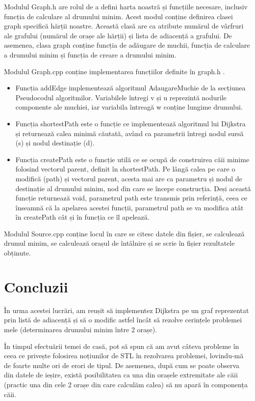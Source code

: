 \documentclass[a4paper]{article}
\begin{document}
Modulul Graph.h are rolul de a defini harta noastră și funcțiile necesare, inclusiv funcția de calculare al drumului minim. 
Acest modul conține definirea clasei graph specifică hărții noastre. Această clasă are ca atribute numărul de vârfruri ale grafului (numărul de orașe ale hărții) și lista de adiacență a grafului. 
De asemenea, clasa graph conține funcția de adăugare de muchii, funcția de calculare a drumului minim și funcția de creare a drumului minim.

Modulul Graph.cpp conține implementarea funcțiilor definite în graph.h .
\begin{itemize}
    \item Funcția addEdge implementează algoritmul AdaugareMuchie de la secțiunea Pseudocodul algoritmilor. Variabilele întregi v și u reprezintă nodurile componente ale muchiei, iar variabila întreagă w conține lungime drumului.
    \item Funcția shortestPath este o funcție ce implementează algoritmul lui Dijkstra și returnează calea minimă căutată, având ca parametrii întregi nodul sursă (s) și nodul destinație (d).
    \item Funcția createPath este o funcție utilă ce se ocupă de construirea căii minime folosind vectorul parent, definit în shortestPath. Pe lângă calea pe care o modifică (path) și vectorul parent, acesta mai are ca parametru și nodul de destinație al drumului minim, nod din care se începe construcția. Deși această funcție returnează void, parametrul path este transmis prin referință, ceea ce înseamnă că la apelarea acestei funcții,
    parametrul path se va modifica atât în createPath cât și în funcția ce îl apelează.
\end{itemize}

Modulul Source.cpp conține locul în care se citesc datele din fișier, se calculează drumul minim, se calculează orașul de întâlnire și se scrie în fișier rezultatele obținute.

\section{Concluzii}

În urma acestei lucrări, am reușit să implementez Dijkstra pe un graf reprezentat prin listă de adiacență și să o modific astfel încât să rezolve cerințele problemei mele (determinarea drumului minim între 2 orașe). 

În timpul efectuării temei de casă, pot să spun că am avut câteva probleme în ceea ce privește folosirea noțiunilor de STL în rezolvarea problemei, lovindu-mă de foarte multe ori de erori de tipul. 
De asemenea, după cum se poate observa din datele de ieșire, există posibilitatea ca una din orașele extremitate ale căii (practic una din cele 2 orașe din care calculăm calea) să nu apară în componența căii. 
\end{document}
